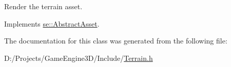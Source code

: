 Render the terrain asset. 

Implements \mbox{\hyperlink{classse_1_1_abstract_asset_a2addad2ca18a3ffbcbe1e80afa0ad56c}{se\+::\+Abstract\+Asset}}.



The documentation for this class was generated from the following file\+:\begin{DoxyCompactItemize}
\item 
D\+:/\+Projects/\+Game\+Engine3\+D/\+Include/\mbox{\hyperlink{_terrain_8h}{Terrain.\+h}}\end{DoxyCompactItemize}
